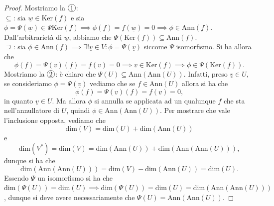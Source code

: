 \begin{proof} Mostriamo la $\circled{1}$: \\ 
    $\boxed{\subseteq}$: sia $\underline{w} \in \text{Ker}(f)$ e sia $\phi = \Psi(\underline{w}) \in \Psi{\text{Ker}(f)} \implies \phi(f) = f(\underline{w}) = 0 \implies \phi \in \text{Ann}(f)$. Dall'arbitrarietà di $\underline{w}$, abbiamo che $\Psi(\text{Ker}(f)) \subseteq \text{Ann}(f)$. \\
    $\boxed{\supseteq}$: sia $\phi \in \text{Ann}(f) \implies \exists ! \underline{v} \in V: \phi = \Psi(\underline{v})$ siccome $\Psi$ isomorfismo. Si ha allora che
    $$
        \phi(f) = \Psi(\underline{v})(f) = f(\underline{v}) = 0 \implies \underline{v} \in \text{Ker}(f) \implies \phi \in \Psi(\text{Ker}(f)).
    $$
    Mostriamo la $\circled{2}$: è chiaro che $\Psi(U) \subseteq \text{Ann}(\text{Ann}(U))$. Infatti, preso $\underline{v} \in U$, se consideriamo $\phi = \Psi(\underline{v})$ vediamo che se $f \in \text{Ann}(U)$ allora si ha che
    $$
        \phi(f) = \Psi(\underline{v})(f) = f(\underline{v}) = 0,
    $$
    in quanto $\underline{v} \in U$. Ma allora $\phi$ si annulla se applicata ad un qualunque $f$ che sta nell'annullatore di $U$, quindi $\phi \in \text{Ann}(\text{Ann}(U))$. Per mostrare che vale l'inclusione opposta, vediamo che
    $$ 
        \text{dim}(V) = \text{dim}(U) + \text{dim}(\text{Ann}(U))
    $$
    e
    $$
        \text{dim}(V^*) = \text{dim}(V) = \text{dim}(\text{Ann}(U)) + \text{dim}(\text{Ann}(\text{Ann}(U))),
    $$
    dunque si ha che
    $$
        \text{dim}(\text{Ann}(\text{Ann}(U))) = \text{dim}(V) - \text{dim}(\text{Ann}(U)) = \text{dim}(U).
    $$
    Essendo $\Psi$ un isomorfismo si ha che $\text{dim}(\Psi(U)) = \text{dim}(U) \implies \text{dim}(\Psi(U)) = \text{dim}(U) = \text{dim}(\text{Ann}(\text{Ann}(U)))$, dunque si deve avere necessariamente che $\Psi(U) = \text{Ann}(\text{Ann}(U)).$
\end{proof}